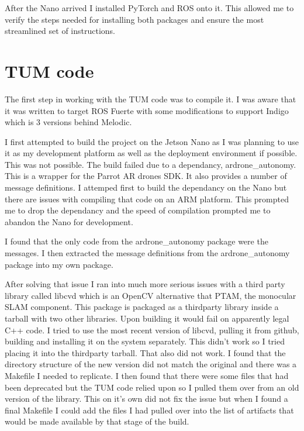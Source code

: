 \documentclass[]{../resources/final_report}
\begin{document}
After the Nano arrived I installed PyTorch and ROS onto it. This allowed me to verify the steps 
needed for installing both packages and ensure the most streamlined set of instructions.


\section{TUM code}

The first step in working with the TUM code was to compile it. I was aware that it was written to 
target ROS Fuerte with some modifications to support Indigo which is 3 versions behind Melodic.

I first attempted to build the project on the Jetson Nano as I was planning to use it as my 
development platform as well as the deployment environment if possible. This was not possible. The 
build failed due to a dependancy, ardrone\_autonomy. This is a wrapper for the Parrot AR drones SDK. 
It also provides a number of message definitions. I attemped first to build the dependancy on the 
Nano but there are issues with compiling that code on an ARM platform. This prompted me to drop the 
dependancy and the speed of compilation prompted me to abandon the Nano for development.

I found that the only code from the ardrone\_autonomy package were the messages. I then extracted 
the message definitions from the ardrone\_autonomy package into my own package.

After solving that issue I ran into much more serious issues with a third party library called 
libcvd which is an OpenCV alternative that PTAM, the monocular SLAM component.
This package is packaged as a thirdparty library inside a tarball with two other libraries.
Upon building it would fail on apparently legal C++ code. I tried to use the most recent version of 
libcvd, pulling it from github, building and installing it on the system separately. This didn't work 
so I tried placing it into the thirdparty tarball. That also did not work. I found that the directory
structure of the new version did not match the original and there was a Makefile I needed to 
replicate. I then found that there were some files that had been deprecated but the TUM code relied 
upon so I pulled them over from an old version of the library. This on it's own did not fix the 
issue but when I found a final Makefile I could add the files I had pulled over into the list of 
artifacts that would be made available by that stage of the build. 
\end{document}
